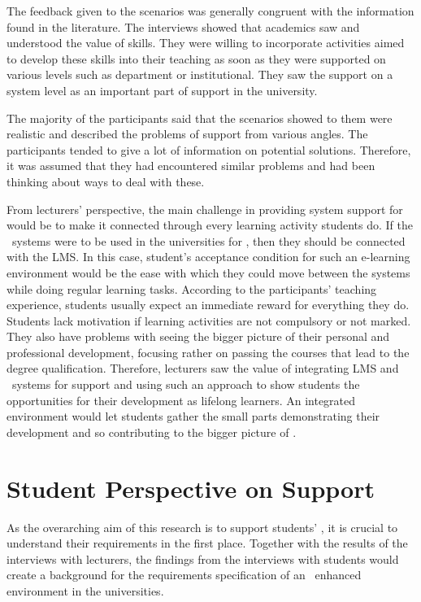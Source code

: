 The feedback given to the scenarios was generally congruent with the information
found in the literature. The interviews showed that academics saw and understood
the value of \LLLs skills. They were willing to incorporate activities aimed to
develop these skills into their teaching as soon as they were supported on
various levels such as department or institutional. They saw the support on a
system level as an important part of \LLLs support in the university.

The majority of the participants said that the scenarios showed to them were
realistic and described the problems of \LLLs support from various angles. The
participants tended to give a lot of information on potential solutions.
Therefore, it was assumed that they had encountered similar problems and had
been thinking about ways to deal with these.

From lecturers' perspective, the main challenge in providing system support for
\LLLs would be to make it connected through every learning activity students do.
If the \ep~systems were to be used in the universities for \LLLs, then they
should be connected with the LMS. In this case, student's acceptance condition
for such an e-learning environment would be the ease with which they could move
between the systems while doing regular learning tasks. According to the
participants' teaching experience, students usually expect an immediate reward
for everything they do. Students lack motivation if learning activities are not
compulsory or not marked. They also have problems with seeing the bigger picture
of their personal and professional development, focusing rather on passing the
courses that lead to the degree qualification. Therefore, lecturers saw the
value of integrating LMS and \ep~systems for \LLLs support and using such
an approach to show students the opportunities for their development as lifelong
learners. An integrated environment would let students gather the small parts
demonstrating their development and so contributing to the bigger picture of
\LLLsn.

\section{Student Perspective on \LLLc Support}

As the overarching aim of this research is to support students' \LLLsn, it is
crucial to understand their requirements in the first place. Together with the
results of the interviews with lecturers, the findings from the interviews with
students would create a background for the requirements specification of an
\ep~enhanced environment in the universities.

